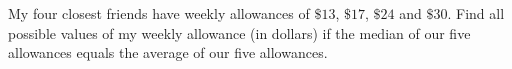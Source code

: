 My four closest friends have weekly allowances of $\$13$, $\$17$, $\$24$ and $\$30$. Find all possible values of my weekly allowance (in dollars) if the median of our five allowances equals the average of our five allowances.
